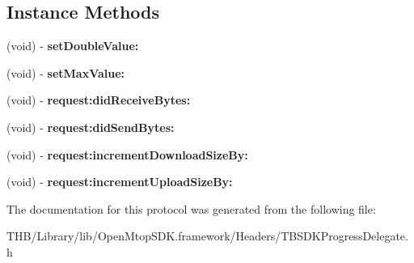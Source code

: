 \subsection*{Instance Methods}
\begin{DoxyCompactItemize}
\item 
\mbox{\label{protocol_t_b_s_d_k_progress_delegate_01-p_a2a90d3e5799f497d910437baf1e6227b}} 
(void) -\/ {\bfseries set\+Double\+Value\+:}
\item 
\mbox{\label{protocol_t_b_s_d_k_progress_delegate_01-p_adb61a23e65b69c25752b8c5a4d974e92}} 
(void) -\/ {\bfseries set\+Max\+Value\+:}
\item 
\mbox{\label{protocol_t_b_s_d_k_progress_delegate_01-p_a788f5b7e53533a3417ec73a38f593c0f}} 
(void) -\/ {\bfseries request\+:did\+Receive\+Bytes\+:}
\item 
\mbox{\label{protocol_t_b_s_d_k_progress_delegate_01-p_ac668e6f50534ac0e1c0b9cba53bf1499}} 
(void) -\/ {\bfseries request\+:did\+Send\+Bytes\+:}
\item 
\mbox{\label{protocol_t_b_s_d_k_progress_delegate_01-p_a279a203532873244cb83675f4cf5b750}} 
(void) -\/ {\bfseries request\+:increment\+Download\+Size\+By\+:}
\item 
\mbox{\label{protocol_t_b_s_d_k_progress_delegate_01-p_ad2a38861ad15dd0cc9f3d400b183d6f0}} 
(void) -\/ {\bfseries request\+:increment\+Upload\+Size\+By\+:}
\end{DoxyCompactItemize}


The documentation for this protocol was generated from the following file\+:\begin{DoxyCompactItemize}
\item 
T\+H\+B/\+Library/lib/\+Open\+Mtop\+S\+D\+K.\+framework/\+Headers/T\+B\+S\+D\+K\+Progress\+Delegate.\+h\end{DoxyCompactItemize}
